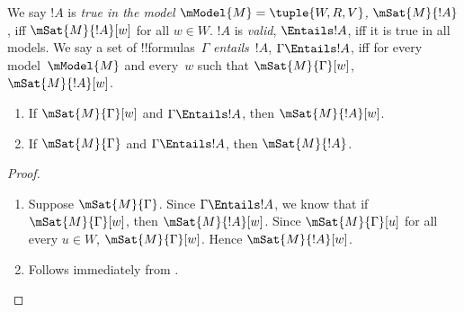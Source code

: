 \documentclass[../../../include/open-logic-section]{subfiles}
\begin{document}


\begin{defn}
  We say $!A$ is \emph{true in the model $\mModel{M} = \tuple{W,R,V}$,}
  $\mSat{M}{!A}$, iff $\mSat{M}{!A}[w]$ for all $w \in W$.
  $!A$ is \emph{valid}, $\Entails !A$, iff it is true in all models.
  We say a set of !!{formula}s~$\Gamma$ \emph{entails}~$!A$, $\Gamma
  \Entails !A$, iff for every model~$\mModel{M}$ and every~$w$ such
  that $\mSat{M}{\Gamma}[w]$, $\mSat{M}{!A}[w]$.
\end{defn}

\begin{prop}

  \begin{enumerate}
  \item{} If $\mSat{M}{\Gamma}[w]$ and
    $\Gamma \Entails !A$, then $\mSat{M}{!A}[w]$.
  \item{} If $\mSat{M}{\Gamma}$ and $\Gamma
    \Entails !A$, then $\mSat{M}{!A}$.
  \end{enumerate}
\end{prop}

\begin{proof}

  \begin{enumerate}
  \item Suppose $\mSat{M}{\Gamma}$. Since $\Gamma \Entails !A$, we
    know that if $\mSat{M}{\Gamma}[w]$, then $\mSat{M}{!A}[w]$. Since
    $\mSat{M}{\Gamma}[u]$ for all every $u \in W$,
    $\mSat{M}{\Gamma}[w]$. Hence $\mSat{M}{!A}[w]$.
  \item Follows immediately from .
  \end{enumerate}
\end{proof}
\end{document}

